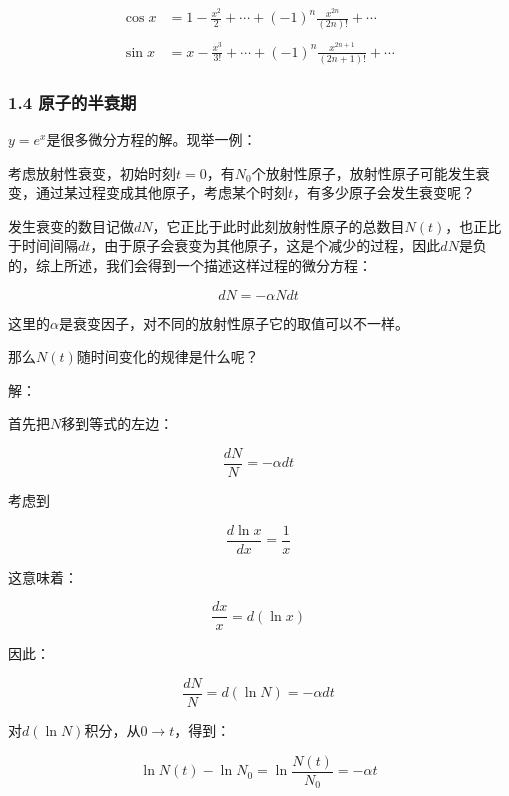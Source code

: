 \begin{align*}
\cos x &= 1 - \frac{x^2}{2} + \cdots + (-1)^n \frac{x^{2n}}{(2n)!} + \cdots \\\\
\sin x &= x - \frac{x^3}{3!} + \cdots + (-1)^n \frac{x^{2n+1}}{(2n+1)!} + \cdots~
\end{align*}

\subsubsection{1.4 原子的半衰期}

$y = e^x$是很多微分方程的解。现举一例：

考虑放射性衰变，初始时刻$t = 0$，有$N_0$个放射性原子，放射性原子可能发生衰变，通过某过程变成其他原子，考虑某个时刻$t$，有多少原子会发生衰变呢？

发生衰变的数目记做$d N$，它正比于此时此刻放射性原子的总数目$N(t)$，也正比于时间间隔$d t$，由于原子会衰变为其他原子，这是个减少的过程，因此$d N$是负的，综上所述，我们会得到一个描述这样过程的微分方程：

\begin{equation}
d N = - \alpha N dt~
\end{equation}

这里的$\alpha$是衰变因子，对不同的放射性原子它的取值可以不一样。

那么$N(t)$随时间变化的规律是什么呢？

解：

首先把$N$移到等式的左边：

\begin{equation}
\frac{dN}{N} = - \alpha dt~
\end{equation}

考虑到

\begin{equation}
\frac{d \ln x}{ d x} = \frac{1}{x}~
\end{equation}

这意味着：

\begin{equation}
\frac{d x}{x} = d ( \ln x )~
\end{equation}

因此：

\begin{equation}
\frac{dN}{N} = d ( \ln N  ) = - \alpha dt~
\end{equation}

对$d (\ln N)$积分，从$0 \to t$，得到：

\begin{equation}
\ln N(t ) - \ln N_0 = \ln \frac{N(t)}{N_0}  = - \alpha t~
\end{equation}


